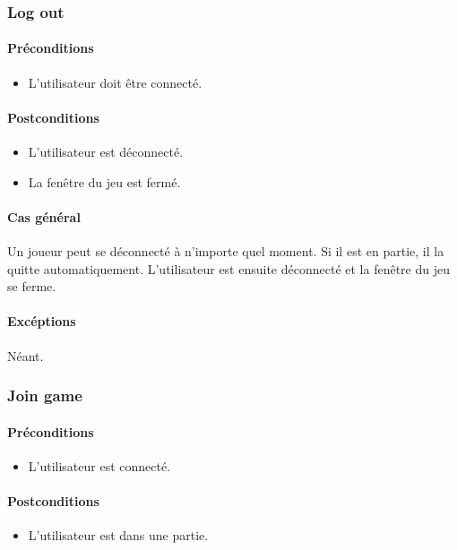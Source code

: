 \documentclass[a4paper,11pt]{report}
\begin{document}
\subsubsection{Log out}
\paragraph{Préconditions}
\begin{itemize}
 \item L'utilisateur doit être connecté.
\end{itemize}
\paragraph{Postconditions}
\begin{itemize}
 \item L'utilisateur est déconnecté.
 \item La fenêtre du jeu est fermé.
\end{itemize}
\paragraph{Cas général}
Un joueur peut se déconnecté à n'importe quel moment. Si il est en partie, il la quitte automatiquement. L'utilisateur
est ensuite déconnecté et la fenêtre du jeu se ferme.
\paragraph{Excéptions} Néant.
\subsubsection{Join game}
\paragraph{Préconditions}
\begin{itemize}
 \item L'utilisateur est connecté.
\end{itemize}
\paragraph{Postconditions}
\begin{itemize}
 \item L'utilisateur est dans une partie.
\end{itemize}
\end{document}
